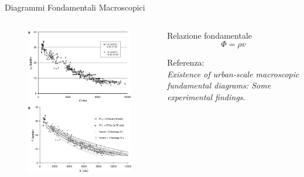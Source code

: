 \documentclass[
	11pt, %
]{beamer}
\begin{document}
\begin{frame}{Diagrammi Fondamentali Macroscopici}
	\begin{columns}[c]
		\begin{column}{.6\textwidth}
			\begin{figure}
				\includegraphics[width=.83\linewidth]{daganzo2.jpg}
			\end{figure}
		\end{column}
		\begin{column}{.4\textwidth}
			\begin{block}{Relazione fondamentale}
				\begin{equation*}
					\Phi=\rho v
				\end{equation*}
			\end{block}
			\vspace{10mm}
			Referenza: \\ \emph{Existence of urban-scale macroscopic fundamental
			diagrams: Some experimental findings}.
		\end{column}	
	\end{columns}
\end{frame}
\end{document}
